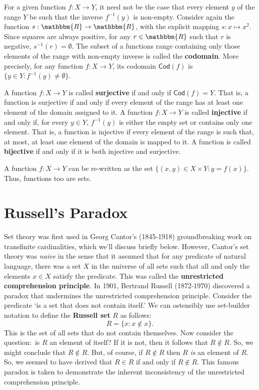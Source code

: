 \documentclass[11pt]{article}
\theoremstyle{definition}
\theoremstyle{remark}
\begin{document}
For a given function $f:X\rightarrow Y$, it need not be the case that every element $y$ of the range $Y$ be such that the inverse $f^{-1}(y)$ is non-empty. Consider again the function $s:\mathbbm{R}\rightarrow\mathbbm{R}$, with the explicit mapping $s:x\mapsto x^{2}$. Since squares are always positive, for any $r\in\mathbbm{R}$ such that $r$ is negative, $s^{-1}(r)=\emptyset$. The subset of a functions range containing only those elements of the range with non-empty inverse is called the \textbf{codomain}. More precisely, for any function $f:X\rightarrow Y$, its codomain $\textsf{Cod}(f)$ is
$\{y\in Y:f^{-1}(y)\neq\emptyset\}$.\par 


A function $f:X\rightarrow Y$ is called \textbf{surjective} if and only if $\textsf{Cod}(f)=Y$. That is, a function is surjective if and only if every element of the range has at least one element of the domain assigned to it. A function $f:X\rightarrow Y$ is called \textbf{injective} if and only if, for every $y\in Y$, $f^{-1}(y)$ is either the empty set or contains only one element. That is, a function is injective if every element of the range is such that, at most, at least one element of the domain is mapped to it. A function is called \textbf{bijective} if and only if it is both injective and surjective.\par 

A function $f:X\rightarrow Y$ can be re-written as the set $\{(x,y)\in X\times Y : y=f(x)\}$. Thus, functions too are sets.\par 

\section{Russell's Paradox}
Set theory was first used in Georg Cantor's (1845-1918) groundbreaking work on transfinite cardinalities, which we'll discuss briefly below. However, Cantor's set theory was \textit{naive} in the sense that it assumed that for any predicate of natural language, there was a set $X$ in the universe of all sets such that all and only the elements $x\in X$ satisfy the predicate. This was called the \textbf{unrestricted comprehension principle}. In 1901, Bertrand Russell (1872-1970) discovered a paradox that undermines the unrestricted comprehension principle. Consider the predicate `is a set that does not contain itself.' We can ostensibly use set-builder notation to define the \textbf{Russell set} $R$ as follows:
$$R=\{x:x\not\in x\}.$$
This is the set of all sets that do not contain themselves. Now consider the question:\ is $R$ an element of itself? If it is not, then it follows that $R\not\in R$. So, we might conclude that $R\not\in R$. But, of course, if $R\not\in R$ then $R$ \textit{is} an element of $R$. So, we seemed to have derived that $R\in R$ if and only if $R\not\in R$. This famous paradox is taken to demonstrate the inherent inconsistency of the unrestricted comprehension principle.\par 
\end{document}
